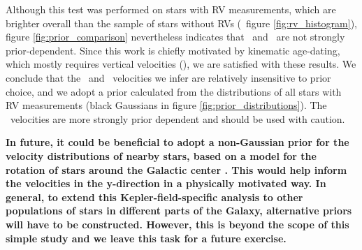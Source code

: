 Although this test was performed on stars with RV measurements, which are
brighter overall than the sample of stars without RVs (\eg\ figure
\ref{fig:rv_histogram}), figure \ref{fig:prior_comparison} nevertheless
indicates that \vx\ and \vz\ are not strongly prior-dependent.
Since this work is chiefly motivated by kinematic age-dating, which mostly
requires vertical velocities (\vz), we are satisfied with these results.
We conclude that the \vx\ and \vz\ velocities we infer are relatively
insensitive to prior choice, and we adopt a prior calculated from the
distributions of all stars with RV measurements (black Gaussians in figure
\ref{fig:prior_distributions}).
The \vy\ velocities are more strongly prior dependent and should be used with
caution.

{\bf
In future, it could be beneficial to adopt a non-Gaussian prior for the
velocity distributions of nearby stars, based on a model for the rotation of
stars around the Galactic center \citep[\eg][]{schonrich2012}.
This would help inform the velocities in the y-direction in a physically
motivated way.
In general, to extend this Kepler-field-specific analysis to other populations
of stars in different parts of the Galaxy, alternative priors will have to be
constructed.
However, this is beyond the scope of this simple study and we leave this task
for a future exercise.
}


